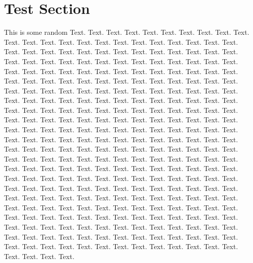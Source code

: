\documentclass{book}
\begin{document}
\section{Test Section}
This is some random Text. Text. Text. Text. Text. Text. Text. Text. Text. Text. Text. Text. Text. Text. Text. Text. Text. Text. Text. Text. Text. Text. Text. Text. Text. Text. Text. Text. Text. Text. Text. Text. Text. Text. Text. Text. Text. Text. Text. Text. Text. Text. Text. Text. Text. Text. Text. Text. Text. Text. Text. Text. Text. Text. Text. Text. Text. Text. Text. Text. Text. Text. Text. Text. Text. Text. Text. Text. Text. Text. Text. Text. Text. Text. Text. Text. Text. Text. Text. Text. Text. Text. Text. Text. Text. Text. Text. Text. Text. Text. Text. Text. Text. Text. Text. Text. Text. Text. Text. Text. Text. Text. Text. Text. Text. Text. Text. Text. Text. Text. Text. Text. Text. Text. Text. Text. Text. Text. Text. Text. Text. Text. Text. Text. Text. Text. Text. Text. Text. Text. Text. Text. Text. Text. Text. Text. Text. Text. Text. Text. Text. Text. Text. Text. Text. Text. Text. Text. Text. Text. Text. Text. Text. Text. Text. Text. Text. Text. Text. Text. Text. Text. Text. Text. Text. Text. Text. Text. Text. Text. Text. Text. Text. Text. Text. Text. Text. Text. Text. Text. Text. Text. Text. Text. Text. Text. Text. Text. Text. Text. Text. Text. Text. Text. Text. Text. Text. Text. Text. Text. Text. Text. Text. Text. Text. Text. Text. Text. Text. Text. Text. Text. Text. Text. Text. Text. Text. Text. Text. Text. Text. Text. Text. Text. Text. Text. Text. Text. Text. Text. Text. Text. Text. Text. Text. Text. Text. Text. Text. Text. Text. Text. Text. Text. Text. Text. Text. Text. Text. Text. Text. Text. Text. Text. Text. Text. Text. Text. Text. Text. Text. Text. Text. Text. Text. Text. Text. Text. Text. Text. Text. Text. Text. Text. Text. Text. Text. Text. Text. Text. Text. Text. Text. Text. Text. Text. Text. Text. Text. Text. Text. Text. Text. Text. Text. Text. Text. Text. Text. Text.
\end{document}

